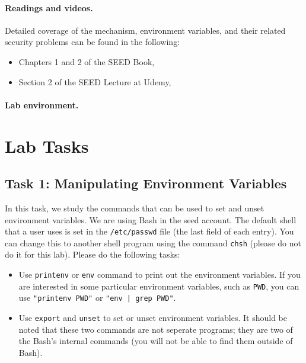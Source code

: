 \paragraph{Readings and videos.}
Detailed coverage of the \setuid mechanism, environment variables,
and their related security problems can be found in the following:

\begin{itemize}
\item Chapters 1 and 2 of the SEED Book, \seedbook
\item Section 2 of the SEED Lecture at Udemy, \seedcsvideo
\end{itemize}

\paragraph{Lab environment.} \seedenvironmentB





\section{Lab Tasks}



\subsection{Task 1: Manipulating Environment Variables}

In this task, we study the commands that can be used to set and unset
environment variables. We are using Bash in the seed account. The default
shell that a user uses is set in  the {\tt /etc/passwd} file (the last
field of each entry). You can change this to another shell program using
the command {\tt chsh} (please do not do it for this lab). Please
do the following tasks:

\begin{itemize}
\item Use {\tt printenv} or {\tt env} command to print out the
environment variables. If you are interested in some particular
environment variables, such as {\tt PWD}, you can use {\tt "printenv PWD"}
or {\tt "env | grep PWD"}.


\item Use {\tt export} and {\tt unset} to set or unset environment
variables. It should be noted that
these two commands are not seperate programs; they are two of
the Bash's internal commands (you will not be able to find them
outside of Bash).

\end{itemize}





